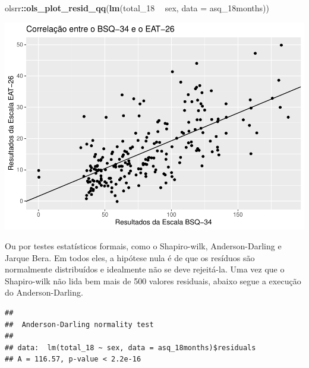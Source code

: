 \documentclass[
]{book}
\newenvironment{Shaded}{\begin{snugshade}}{\end{snugshade}}
\newcommand{\DataTypeTok}[1]{\textcolor[rgb]{0.13,0.29,0.53}{#1}}
\newcommand{\DecValTok}[1]{\textcolor[rgb]{0.00,0.00,0.81}{#1}}
\newcommand{\KeywordTok}[1]{\textcolor[rgb]{0.13,0.29,0.53}{\textbf{#1}}}
\newcommand{\NormalTok}[1]{#1}
\newcommand{\OperatorTok}[1]{\textcolor[rgb]{0.81,0.36,0.00}{\textbf{#1}}}
\newcommand{\StringTok}[1]{\textcolor[rgb]{0.31,0.60,0.02}{#1}}
\begin{document}
\begin{Shaded}
\begin{Highlighting}[]
\NormalTok{olsrr}\OperatorTok{::}\KeywordTok{ols_plot_resid_qq}\NormalTok{(}\KeywordTok{lm}\NormalTok{(total_}\DecValTok{18} \OperatorTok{~}\StringTok{ }\NormalTok{sex, }\DataTypeTok{data =}\NormalTok{ asq_18months))}
\end{Highlighting}
\end{Shaded}

\begin{center}\includegraphics{gitbook-demo_files/figure-latex/unnamed-chunk-82-1} \end{center}

Ou por testes estatísticos formais, como o Shapiro-wilk, Anderson-Darling e Jarque Bera. Em todos eles, a hipótese nula é de que os resíduos são normalmente distribuídos e idealmente não se deve rejeitá-la. Uma vez que o Shapiro-wilk não lida bem mais de 500 valores residuais, abaixo segue a execução do Anderson-Darling.

\begin{Shaded}
\end{Shaded}

\begin{verbatim}
## 
##  Anderson-Darling normality test
## 
## data:  lm(total_18 ~ sex, data = asq_18months)$residuals
## A = 116.57, p-value < 2.2e-16
\end{verbatim}
\end{document}
